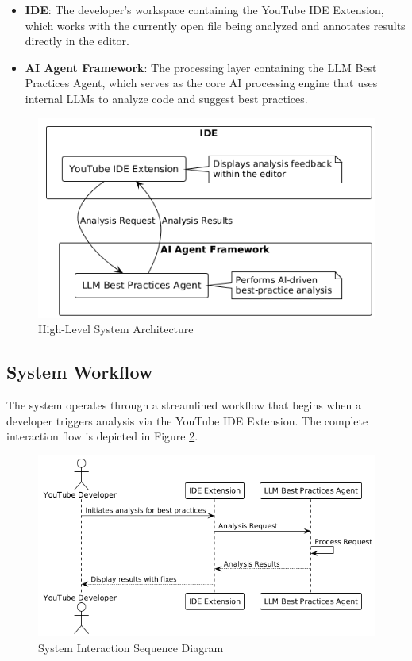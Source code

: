 \begin{spacing}{1.2}
\begin{itemize}
    \item \textbf{IDE}: The developer's workspace containing the YouTube IDE Extension, which works with the currently open file being analyzed and annotates results directly in the editor.
    \item \textbf{AI Agent Framework}: The processing layer containing the LLM Best Practices Agent, which serves as the core AI processing engine that uses internal LLMs to analyze code and suggest best practices.
\end{itemize}

\begin{figure}[H]
\centering
\includegraphics[scale=0.7]{images/high_level_system_architecture.png}
\caption{High-Level System Architecture}
\label{fig:system_architecture}
\end{figure}

\subsection{System Workflow}
The system operates through a streamlined workflow that begins when a developer triggers analysis via the YouTube IDE Extension. The complete interaction flow is depicted in Figure \ref{fig:sequence_diagram}.

\begin{figure}[H]
\centering
\includegraphics[scale=0.7]{images/sequence_diagram.png}
\caption{System Interaction Sequence Diagram}
\label{fig:sequence_diagram}
\end{figure}


\end{spacing}
